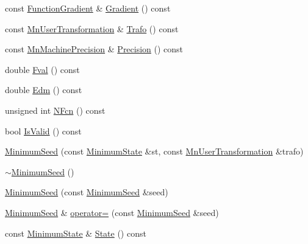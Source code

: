 \begin{DoxyCompactItemize}
const \mbox{\hyperlink{classROOT_1_1Minuit2_1_1FunctionGradient}{Function\+Gradient}} \& \mbox{\hyperlink{classROOT_1_1Minuit2_1_1MinimumSeed_acde7a067ded2fb87a3dba51ba82a1afd}{Gradient}} () const
\item 
const \mbox{\hyperlink{classROOT_1_1Minuit2_1_1MnUserTransformation}{Mn\+User\+Transformation}} \& \mbox{\hyperlink{classROOT_1_1Minuit2_1_1MinimumSeed_a140162d25593e6675f6f521fc9d5fc84}{Trafo}} () const
\item 
const \mbox{\hyperlink{classROOT_1_1Minuit2_1_1MnMachinePrecision}{Mn\+Machine\+Precision}} \& \mbox{\hyperlink{classROOT_1_1Minuit2_1_1MinimumSeed_a0cc83616e61f2d3552cedf34ed09e361}{Precision}} () const
\item 
double \mbox{\hyperlink{classROOT_1_1Minuit2_1_1MinimumSeed_a55c498b499c84f1a693729aa269db9aa}{Fval}} () const
\item 
double \mbox{\hyperlink{classROOT_1_1Minuit2_1_1MinimumSeed_ab378accd110c0313557d3e916e2a9282}{Edm}} () const
\item 
unsigned int \mbox{\hyperlink{classROOT_1_1Minuit2_1_1MinimumSeed_a095d402b58fea6b0b06323b079974bf3}{N\+Fcn}} () const
\item 
bool \mbox{\hyperlink{classROOT_1_1Minuit2_1_1MinimumSeed_a5d9ffd4dbd68f6cfcfef821844e70158}{Is\+Valid}} () const
\item 
\mbox{\hyperlink{classROOT_1_1Minuit2_1_1MinimumSeed_a0d3070cfaa1be8ce9e9e64f39a30b875}{Minimum\+Seed}} (const \mbox{\hyperlink{classROOT_1_1Minuit2_1_1MinimumState}{Minimum\+State}} \&st, const \mbox{\hyperlink{classROOT_1_1Minuit2_1_1MnUserTransformation}{Mn\+User\+Transformation}} \&trafo)
\item 
\mbox{\hyperlink{classROOT_1_1Minuit2_1_1MinimumSeed_a99b95b10842f335d10bf7293f7d91b92}{$\sim$\+Minimum\+Seed}} ()
\item 
\mbox{\hyperlink{classROOT_1_1Minuit2_1_1MinimumSeed_a720f1ac742c7c9c8425bad7b4dc7dd12}{Minimum\+Seed}} (const \mbox{\hyperlink{classROOT_1_1Minuit2_1_1MinimumSeed}{Minimum\+Seed}} \&seed)
\item 
\mbox{\hyperlink{classROOT_1_1Minuit2_1_1MinimumSeed}{Minimum\+Seed}} \& \mbox{\hyperlink{classROOT_1_1Minuit2_1_1MinimumSeed_a0ec0790834635093f5b3cffa976efe60}{operator=}} (const \mbox{\hyperlink{classROOT_1_1Minuit2_1_1MinimumSeed}{Minimum\+Seed}} \&seed)
\item 
const \mbox{\hyperlink{classROOT_1_1Minuit2_1_1MinimumState}{Minimum\+State}} \& \mbox{\hyperlink{classROOT_1_1Minuit2_1_1MinimumSeed_a732476aa579a27366511684213835a2e}{State}} () const

\end{DoxyCompactItemize}
